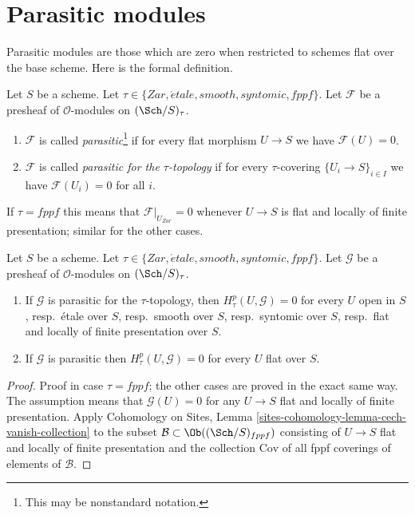 \section{Parasitic modules}
\label{section-parasitic}

\noindent
Parasitic modules are those which are zero when restricted
to schemes flat over the base scheme. Here is the formal definition.

\begin{definition}
\label{definition-parasitic}
Let $S$ be a scheme. Let $\tau \in \{Zar, \acute{e}tale,
smooth, syntomic, fppf\}$. Let $\mathcal{F}$ be a presheaf
of $\mathcal{O}$-modules on $(\Sch/S)_\tau$.
\begin{enumerate}
\item $\mathcal{F}$ is called
{\it parasitic}\footnote{This may be nonstandard notation.}
if for every flat morphism $U \to S$ we have $\mathcal{F}(U) = 0$.
\item $\mathcal{F}$ is called {\it parasitic for the $\tau$-topology}
if for every $\tau$-covering $\{U_i \to S\}_{i \in I}$ we have
$\mathcal{F}(U_i) = 0$ for all $i$.
\end{enumerate}
\end{definition}

\noindent
If $\tau = fppf$ this means that $\mathcal{F}|_{U_{Zar}} = 0$ whenever
$U \to S$ is flat and locally of finite presentation; similar for
the other cases.

\begin{lemma}
\label{lemma-cohomology-parasitic}
Let $S$ be a scheme. Let $\tau \in \{Zar, \acute{e}tale, smooth,
syntomic, fppf\}$. Let $\mathcal{G}$ be a presheaf of
$\mathcal{O}$-modules on $(\Sch/S)_\tau$.
\begin{enumerate}
\item If $\mathcal{G}$ is parasitic for the $\tau$-topology, then
$H^p_\tau(U, \mathcal{G}) = 0$ for every $U$ open in $S$,
resp.\ \'etale over $S$,
resp.\ smooth over $S$,
resp.\ syntomic over $S$,
resp.\ flat and locally of finite presentation over $S$.
\item If $\mathcal{G}$ is parasitic then $H^p_\tau(U, \mathcal{G}) = 0$
for every $U$ flat over $S$.
\end{enumerate}
\end{lemma}

\begin{proof}
Proof in case $\tau = fppf$; the other cases are proved in the
exact same way. The assumption means that $\mathcal{G}(U) = 0$ for any
$U \to S$ flat and locally of finite presentation. Apply
Cohomology on Sites, Lemma \ref{sites-cohomology-lemma-cech-vanish-collection}
to the subset $\mathcal{B} \subset \Ob((\Sch/S)_{fppf})$ consisting
of $U \to S$ flat and locally of finite presentation and the collection
$\text{Cov}$ of all fppf coverings of elements of $\mathcal{B}$.
\end{proof}

